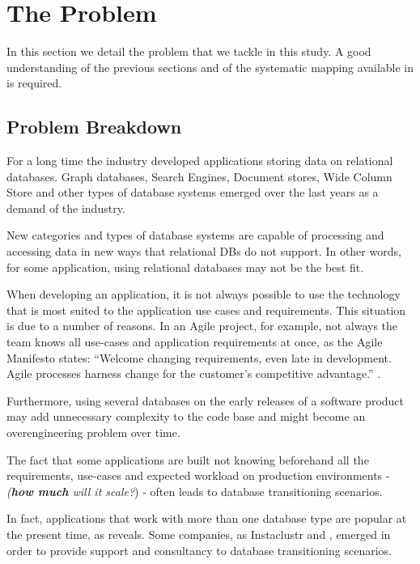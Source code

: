 \chapter{The Problem}\label{theProblemChap}
In this section we detail the problem that we tackle in this study. A good understanding of the previous sections and of the systematic mapping available in \cite{fabioMartinSM} is required.

\section{Problem Breakdown}

For a long time the industry developed applications storing data on relational databases. Graph databases, Search Engines, Document stores, Wide Column Store and other types of database systems emerged over the last years as a demand of the industry. 

New categories and types of database systems are capable of processing and accessing data in new ways that relational DBs do not support. In other words, for some application, using relational databases may not be the best fit. 

When developing an application, it is not always possible to use the technology that is most suited to the application use cases and requirements. This situation is due to a number of reasons. In an Agile project, for example, not always the team knows all use-cases and application requirements at once, as the Agile Manifesto states: ``Welcome changing requirements, even late in 
development. Agile processes harness change for 
the customer's competitive advantage.'' \cite{fowler2001agile}. 

Furthermore, using several databases on the early releases of a software product may add unnecessary complexity to the code base and might become an overengineering problem over time. 

The fact that some applications are built not knowing beforehand all the requirements, use-cases and expected workload on production environments - \textit{(\textbf{how much} will it scale?}) - often leads to database transitioning scenarios.

In fact, applications that work with more than one database type are popular at the present time, as \cite{sadalage2012nosql} reveals. Some companies, as Instaclustr \cite{instaclustr} and \cite{elastic}, emerged in order to provide support and consultancy to database transitioning scenarios.

